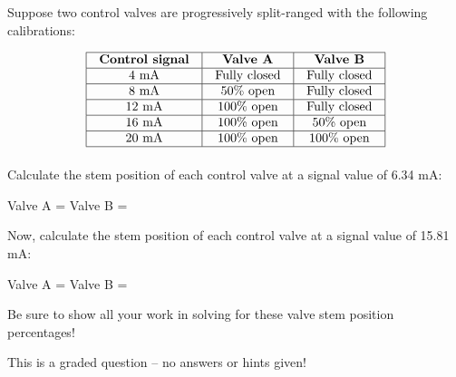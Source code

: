 

Suppose two control valves are progressively split-ranged with the following calibrations:


$$\vbox{\offinterlineskip
\halign{\strut
\vrule \quad\hfil # \ \hfil & 
\vrule \quad\hfil # \ \hfil & 
\vrule \quad\hfil # \ \hfil \vrule \cr
\noalign{\hrule}
%
{\bf Control signal} & {\bf Valve A} & {\bf Valve B} \cr
%
\noalign{\hrule}
%
4 mA & Fully closed & Fully closed \cr
%
\noalign{\hrule}
%
8 mA & 50\% open & Fully closed \cr
%
\noalign{\hrule}
%
12 mA & 100\% open & Fully closed \cr
%
\noalign{\hrule}
%
16 mA & 100\% open & 50\% open \cr
%
\noalign{\hrule}
%
20 mA & 100\% open & 100\% open \cr
%
\noalign{\hrule}
} %
}$$ %

\vskip 10pt

Calculate the stem position of each control valve at a signal value of 6.34 mA:

\vskip 10pt

Valve A = \underbar{\hskip 50pt} \hskip 50pt Valve B = \underbar{\hskip 50pt}

\vskip 150pt

Now, calculate the stem position of each control valve at a signal value of 15.81 mA:

\vskip 10pt

Valve A = \underbar{\hskip 50pt} \hskip 50pt Valve B = \underbar{\hskip 50pt}

\vfil 

Be sure to show all your work in solving for these valve stem position percentages!

\eject






This is a graded question -- no answers or hints given!







